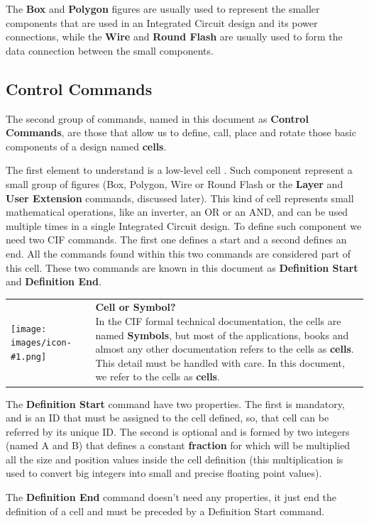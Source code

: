 \documentclass[11pt,twoside,openany,x11names,svgnames]{memoir}
\makeatletter
\newcommand{\IconNote}[3]
{
	\begin{table}[ht]
	\begin{tabular}{ lm{\dimexpr\textwidth-8\tabcolsep-\wd0}@{}}
		\toprule
		\texttt{[image: images/icon-\#1.png]}
		&
		\parbox[t]{155mm}{
		\textbf{#2} \\
		#3
		}
	\end{tabular}
\end{table}
}
\makeatother
\begin{document}
The \textbf{Box} and \textbf{Polygon} figures are usually used to represent the smaller components that are used in an Integrated Circuit design and its power connections, while the \textbf{Wire} and \textbf{Round Flash} are usually used to form the data connection between  the small components.

\subsection{Control Commands}\label{Control-Commands}

The second group of commands, named in this document as \textbf{Control Commands}, are those that allow us to define, call, place and rotate those basic components of a design named \textbf{cells}.

The first element to understand is a low-level cell . Such component represent a small group of figures (Box, Polygon, Wire or Round Flash or the \textbf{Layer} and \textbf{User Extension} commands, discussed later). This kind of cell represents small mathematical operations, like an inverter, an OR or an AND, and can be used multiple times in a single Integrated Circuit design. To define such component we need two CIF commands. The first one defines a start and a second defines an end. All the commands found within this two commands are considered part of this cell. These two commands are known in this document as \textbf{Definition Start} and \textbf{Definition End}.

\IconNote
	{warning}
	{Cell or Symbol?}
	{In the CIF formal technical documentation, the cells are named \textbf{Symbols}, but most of the applications, books and almost any other documentation refers to the cells as \textbf{cells}. This detail must be handled with care. In this document, we refer to the cells as \textbf{cells}.}
	
The \textbf{Definition Start} command have two properties. The first is mandatory, and is an ID that must be assigned to the cell defined, so, that cell can be referred by its unique ID. The second is optional and is formed by two integers (named A and B) that defines a constant \textbf{fraction} for which will be multiplied all the size and position values inside the cell definition (this multiplication is used to convert big integers into small and precise floating point values).

The \textbf{Definition End} command doesn't need any properties, it just end the definition of a cell and must be preceded by a Definition Start command.
\end{document}
